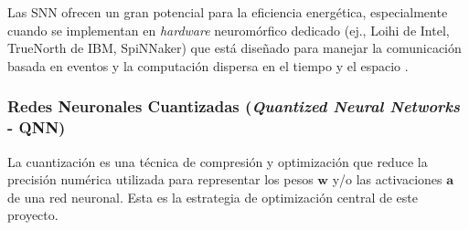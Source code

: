 \documentclass[12pt]{article}
\begin{document}
Las SNN ofrecen un gran potencial para la eficiencia energética, especialmente cuando se implementan en \textit{hardware} neuromórfico dedicado (ej., Loihi de Intel, TrueNorth de IBM, SpiNNaker) que está diseñado para manejar la comunicación basada en eventos y la computación dispersa en el tiempo y el espacio \cite{intel2021loihi2}.

\subsubsection{Redes Neuronales Cuantizadas (\textit{Quantized Neural Networks} - QNN)}
\label{sssec:qnn_exp}
La cuantización es una técnica de compresión y optimización que reduce la precisión numérica utilizada para representar los pesos $\bm{w}$ y/o las activaciones $\bm{a}$ de una red neuronal. Esta es la estrategia de optimización central de este proyecto.
\end{document}
